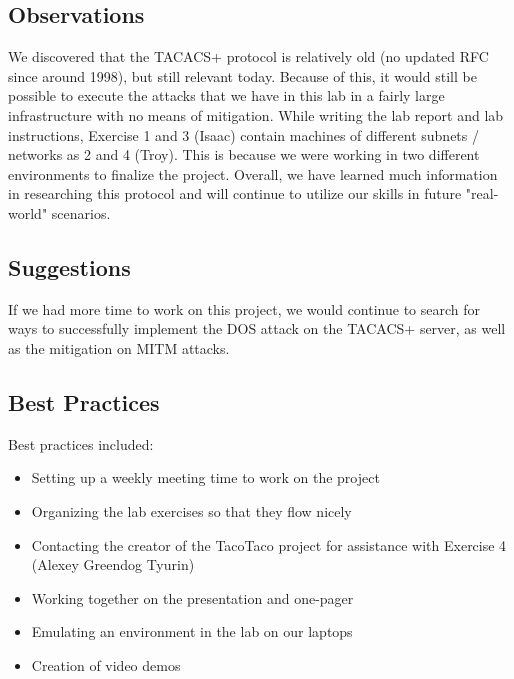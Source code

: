 \documentclass[main.tex]{subfiles}
\begin{document}
\subsection{Observations}
We discovered that the TACACS+ protocol is relatively old (no updated RFC since around 1998), but still relevant today. Because of this, it would still be possible to execute the attacks that we have in this lab in a fairly large infrastructure with no means of mitigation. While writing the lab report and lab instructions, Exercise 1 and 3 (Isaac) contain machines of different subnets / networks as 2 and 4 (Troy). This is because we were working in two different environments to finalize the project. Overall, we have learned much information in researching this protocol and will continue to utilize our skills in future "real-world" scenarios.

\subsection{Suggestions}
If we had more time to work on this project, we would continue to search for ways to successfully implement the DOS attack on the TACACS+ server, as well as the mitigation on MITM attacks.

\subsection{Best Practices}
Best practices included:
\begin{itemize}
    \item Setting up a weekly meeting time to work on the project
    \item Organizing the lab exercises so that they flow nicely
    \item Contacting the creator of the TacoTaco project for assistance with Exercise 4 (Alexey Greendog Tyurin)
    \item Working together on the presentation and one-pager
    \item Emulating an environment in the lab on our laptops
    \item Creation of video demos
\end{itemize}
\end{document}

